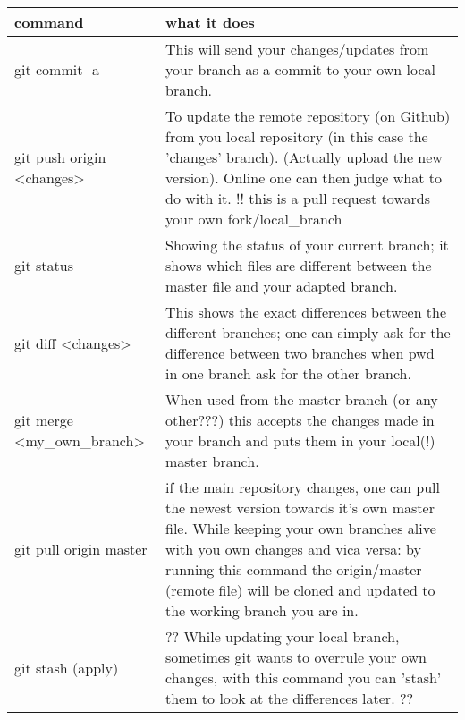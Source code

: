 \begin{center}
\begin{tabular}{l|l}
\textbf{command} &  \textbf{what it does} \\
\hline
  git commit -a & This will send your changes/updates from your branch as a commit to your own local branch. \\
  git push origin \textless changes\textgreater & To update the remote repository (on Github) from you local repository (in this case the 'changes' branch). (Actually upload the new version). Online one can then judge what to do with it. !! this is a pull request towards your own fork/local\_branch \\ 
  git status & Showing the status of your current branch; it shows which files are different between the master file and your adapted branch. \\
  git diff \textless changes\textgreater& This shows the exact differences between the different branches; one can simply ask for the difference between two branches when pwd in one branch ask for the other branch. \\ 
  git merge \textless my\_own\_branch\textgreater & When used from the master branch (or any other???) this accepts the changes made in your branch and puts them in your local(!) master branch. \\ 
  git pull origin master & if the main repository changes, one can pull the newest version towards it's own master file. While keeping your own branches alive with you own changes and vica versa: by running this command the origin/master (remote file) will be cloned and updated to the working branch you are in. \\
  git stash (apply) & ?? While updating your local branch, sometimes git wants to overrule your own changes, with this command you can 'stash' them to look at the differences later. ?? \\
\end{tabular}
\end{center}